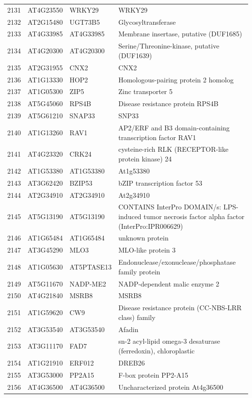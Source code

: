 \documentclass[11pt]{article}
\begin{document}
\begin{center}
\begin{tabular}{rlll}
2131 & AT4G23550 & WRKY29 & WRKY29\\
2132 & AT2G15480 & UGT73B5 & Glycosyltransferase\\
2133 & AT4G33985 & AT4G33985 & Membrane insertase, putative (DUF1685)\\
2134 & AT4G20300 & AT4G20300 & Serine/Threonine-kinase, putative (DUF1639)\\
2135 & AT2G31955 & CNX2 & CNX2\\
2136 & AT1G13330 & HOP2 & Homologous-pairing protein 2 homolog\\
2137 & AT1G05300 & ZIP5 & Zinc transporter 5\\
2138 & AT5G45060 & RPS4B & Disease resistance protein RPS4B\\
2139 & AT5G61210 & SNAP33 & SNP33\\
2140 & AT1G13260 & RAV1 & AP2/ERF and B3 domain-containing transcription factor RAV1\\
2141 & AT4G23320 & CRK24 & cysteine-rich RLK (RECEPTOR-like protein kinase) 24\\
2142 & AT1G53380 & AT1G53380 & At1g53380\\
2143 & AT3G62420 & BZIP53 & bZIP transcription factor 53\\
2144 & AT2G34910 & AT2G34910 & At2g34910\\
2145 & AT5G13190 & AT5G13190 & CONTAINS InterPro DOMAIN/s: LPS-induced tumor necrosis factor alpha factor (InterPro:IPR006629)\\
2146 & AT1G65484 & AT1G65484 & unknown protein\\
2147 & AT3G45290 & MLO3 & MLO-like protein 3\\
2148 & AT1G05630 & AT5PTASE13 & Endonuclease/exonuclease/phosphatase family protein\\
2149 & AT5G11670 & NADP-ME2 & NADP-dependent malic enzyme 2\\
2150 & AT4G21840 & MSRB8 & MSRB8\\
2151 & AT1G59620 & CW9 & Disease resistance protein (CC-NBS-LRR class) family\\
2152 & AT3G53540 & AT3G53540 & Afadin\\
2153 & AT3G11170 & FAD7 & sn-2 acyl-lipid omega-3 desaturase (ferredoxin), chloroplastic\\
2154 & AT1G21910 & ERF012 & DREB26\\
2155 & AT3G53000 & PP2A15 & F-box protein PP2-A15\\
2156 & AT4G36500 & AT4G36500 & Uncharacterized protein At4g36500\\

\end{tabular}
\end{center}
\end{document}
